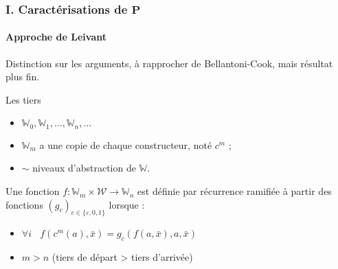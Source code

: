 \documentclass[10pt]{beamer}
\newcommand{\bbW}{\mathbb{W}}
\begin{document}
	\begin{frame}
		\frametitle{I. Caractérisations de $\textbf{P}$}
		\framesubtitle{Approche de Leivant}
		
		
		Distinction sur les arguments, à rapprocher de Bellantoni-Cook, mais résultat plus fin. 
		
		\pause
		
		\begin{block}{Les tiers}
			\begin{itemize}
				\item 	$\bbW_0, \bbW_1, \dots, \bbW_n, \dots$
				\item 	$\bbW_m$ a une copie de chaque constructeur, noté $c^m$ ;
				\item 	$\sim$ niveaux d'abstraction de $\bbW$.
			\end{itemize}
		\end{block}
		
		\pause 
		
		\begin{defn}
			Une fonction $f: \bbW_m \times \mathcal{W} \to \bbW_n$ est définie par récurrence ramifiée à partir des fonctions $\left( g_{c} \right)_{c \in \{\varepsilon, 0, 1\}}$ lorsque :
			\begin{itemize}
				\item $\forall i \:\:\:\:
				f(c^m(a), \bar{x}) 
				= g_{c}\left( f(a, \bar{x}), a, \bar{x} \right)
				$
				\item 	$m > n$ (tiers de départ > tiers d'arrivée)
			\end{itemize}
			
		\end{defn}
	\end{frame}
%			
%			
%	
\end{document}
